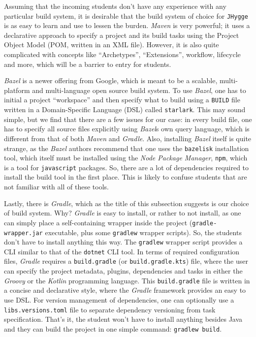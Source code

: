 Assuming that the incoming students don't have any experience with any particular build system, it is desirable that the
build system of choice for \texttt{JHygge} is as easy to learn and use to lessen the burden. \textit{Maven} is very
powerful; it uses a declarative approach to specify a project and its build tasks using the Project Object Model (POM,
written in an XML file).
However, it is also quite complicated with concepts like ``Archetypes'', ``Extensions'', workflow, lifecycle and more,
which will be a barrier to entry for students.

\textit{Bazel} is a newer offering from Google, which is meant to be a scalable, multi-platform and multi-language open source
build system. To use \textit{Bazel}, one has to initial a project ``workspace'' and then specify what to build using a \texttt{BUILD}
file written in a Domain-Specific Language (DSL) called \texttt{starlark}. This may sound simple, but we find that there are a few
issues for our case: in every build file, one has to specify all source files explicitly using \textit{Bazel}s own query language,
which is different from that of both \textit{Maven} and \textit{Gradle}. Also, installing \textit{Bazel} itself is quite strange,
as the \textit{Bazel} authors recommend that one uses the \texttt{bazelisk} installation tool, which itself must be installed using
the \textit{Node Package Manager}, \texttt{npm}, which is a tool for \texttt{javascript} packages. So, there are a lot of dependencies
required to install the build tool in the first place. This is likely to confuse students that are not familiar with all of these tools.

Lastly, there is \textit{Gradle}, which as the title of this subsection suggests is our choice of build system. Why?
\textit{Gradle} is easy to install, or rather to not install, as one can simply place a self-containing wrapper inside the project
(\texttt{gradle-wrapper.jar} executable, plus some \texttt{gradlew} wrapper scripts). So, the students don't have to install anything
this way. The \texttt{gradlew} wrapper script provides a CLI similar to that of the \texttt{dotnet} CLI tool. In terms of required
configuration files, \textit{Gradle} requires a \texttt{build.gradle} (or \texttt{build.gradle.kts}) file, where the user can specify
the project metadata, plugins, dependencies and tasks in either the \textit{Groovy} or the \textit{Kotlin} programming language.
This \texttt{build.gradle} file is written in a concise and declarative style, where the \textit{Gradle} framework provides an
easy to use DSL. For version management of dependencies, one can optionally use a \texttt{libs.versions.toml} file to separate
dependency versioning from task specification. That's it, the student won't have to install anything besides Java and they
can build the project in one simple command: \texttt{gradlew build}.

